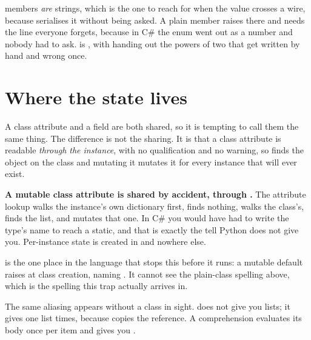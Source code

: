  members \emph{are} strings, which is the one to reach for
when the value crosses a wire, because  serialises it
without being asked. A plain  member raises 
there and needs  \dash{} the line everyone forgets, because in
C\# the enum went out as a number and nobody had to ask.  is
\code{[Flags]}, with  handing out the powers of two that get
written by hand and wrong once.

\section{Where the state lives}
\label{sec:ch04-state}

A class attribute and a  field are both shared, so it is
tempting to call them the same thing. The difference is not the sharing. It
is that a class attribute is readable \emph{through the instance}, with no
qualification and no warning, so  finds the object on the
class \dash{} and mutating it mutates it for every instance that will ever
exist.




\begin{trapbox}
\textbf{A mutable class attribute is shared by accident, through
.} The attribute lookup walks the instance's own dictionary
first, finds nothing, walks the class's, finds the list, and mutates that
one. In C\# you would have had to write the type's name to reach a static,
and that is exactly the tell Python does not give you. Per-instance state
is created in  and nowhere else.
\end{trapbox}

\noindent
{} is the one place in the language that stops this before
it runs: a mutable default raises  at class creation,
naming . It cannot see the plain-class spelling
above, which is the spelling this trap actually arrives in.

The same aliasing appears without a class in sight.  does
not give you  lists; it gives one list  times, because
\code{*} copies the reference. A comprehension evaluates its body once per
item and gives you .

